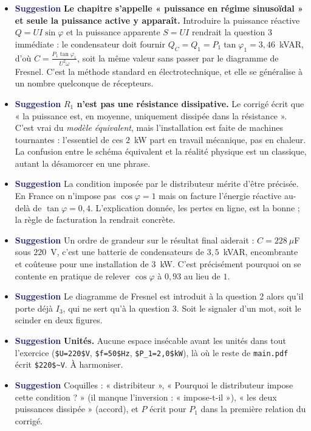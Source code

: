 \documentclass[a4paper,11pt]{article}
\newcommand{\suggestion}{\textcolor{MidnightBlue}{\textbf{Suggestion}}}
\begin{document}
\begin{itemize}
	\item \suggestion{} \textbf{Le chapitre s'appelle « puissance en régime sinusoïdal » et seule la
	puissance active y apparaît.} Introduire la puissance réactive $Q=UI\sin\varphi$ et la puissance
	apparente $S=UI$ rendrait la question 3 immédiate : le condensateur doit fournir
	$Q_C=Q_1=P_1\tan\varphi_1=3{,}46$~kVAR, d'où $C=\frac{P_1\tan\varphi_1}{U^2\omega}$, soit la même
	valeur sans passer par le diagramme de Fresnel. C'est la méthode standard en électrotechnique, et
	elle se généralise à un nombre quelconque de récepteurs.
	\item \suggestion{} \textbf{$R_1$ n'est pas une résistance dissipative.} Le corrigé écrit que « la
	puissance est, en moyenne, uniquement dissipée dans la résistance ». C'est vrai du \textit{modèle
	équivalent}, mais l'installation est faite de machines tournantes : l'essentiel de ces $2$~kW part
	en travail mécanique, pas en chaleur. La confusion entre le schéma équivalent et la réalité
	physique est un classique, autant la désamorcer en une phrase.
	\item \suggestion{} La condition imposée par le distributeur mérite d'être précisée. En France on
	n'impose pas $\cos\varphi=1$ mais on facture l'énergie réactive au-delà de $\tan\varphi=0{,}4$.
	L'explication donnée, les pertes en ligne, est la bonne ; la règle de facturation la rendrait
	concrète.
	\item \suggestion{} Un ordre de grandeur sur le résultat final aiderait : $C=228~\mu$F sous
	$220$~V, c'est une batterie de condensateurs de $3{,}5$~kVAR, encombrante et coûteuse pour une
	installation de $3$~kW. C'est précisément pourquoi on se contente en pratique de relever
	$\cos\varphi$ à $0{,}93$ au lieu de $1$.
	\item \suggestion{} Le diagramme de Fresnel est introduit à la question 2 alors qu'il porte déjà
	$I_3$, qui ne sert qu'à la question 3. Soit le signaler d'un mot, soit le scinder en deux figures.
	\item \suggestion{} \textbf{Unités.} Aucune espace insécable avant les unités dans tout l'exercice
	(\texttt{\$U=220\$V}, \texttt{\$f=50\$Hz}, \texttt{\$P\_1=2,0\$kW}), là où le reste de
	\texttt{main.pdf} écrit \texttt{\$220\$\textasciitilde V}. À harmoniser.
	\item \suggestion{} Coquilles : « distribiteur », « Pourquoi le distributeur impose cette
	condition ? » (il manque l'inversion : « impose-t-il »), « les deux puissances dissipée » (accord),
	et $P$ écrit pour $P_1$ dans la première relation du corrigé.
\end{itemize}
\end{document}
